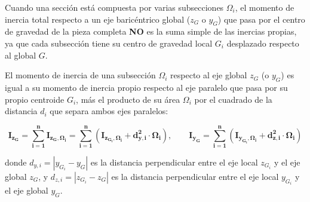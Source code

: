 Cuando una sección está compuesta por varias subsecciones $\Omega_i$, el momento de inercia total respecto a un eje baricéntrico global ($z_G$ o $y_G$) que pasa por el centro de gravedad de la pieza completa \textbf{NO} es la suma simple de las inercias propias, ya que cada subsección tiene su centro de gravedad local $G_i$ desplazado respecto al global $G$.



\begin{tcolorbox}[colback=yellow!10, colframe=orange!85!black, title=\textbf{Teorema de Steiner y Procedimiento Sistemático en Secciones Compuestas}]

    El momento de inercia de una subsección $\Omega_i$ respecto al eje global $z_G$ (o $y_G$) es igual a su momento de inercia propio respecto al eje paralelo que pasa por su propio centroide $G_i$, más el producto de su área $\Omega_i$ por el cuadrado de la distancia $d_i$ que separa ambos ejes paralelos:

    \begin{equation}
        \mathbf{I_{z_G} = \sum_{i=1}^{n} I_{z_G, \Omega_i} = \sum_{i=1}^{n} \left( I_{z_{G_i}, \Omega_i} + d_{y,i}^2 \cdot \Omega_i \right)}, \qquad \mathbf{I_{y_G} = \sum_{i=1}^{n} \left( I_{y_{G_i}, \Omega_i} + d_{z,i}^2 \cdot \Omega_i \right)}
\end{equation}

    donde $d_{y,i} = |y_{G_i} - y_G|$ es la distancia perpendicular entre el eje local $z_{G_i}$ y el eje global $z_G$, y $d_{z,i} = |z_{G_i} - z_G|$ es la distancia perpendicular entre el eje local $y_{G_i}$ y el eje global $y_G$.

\end{tcolorbox}




